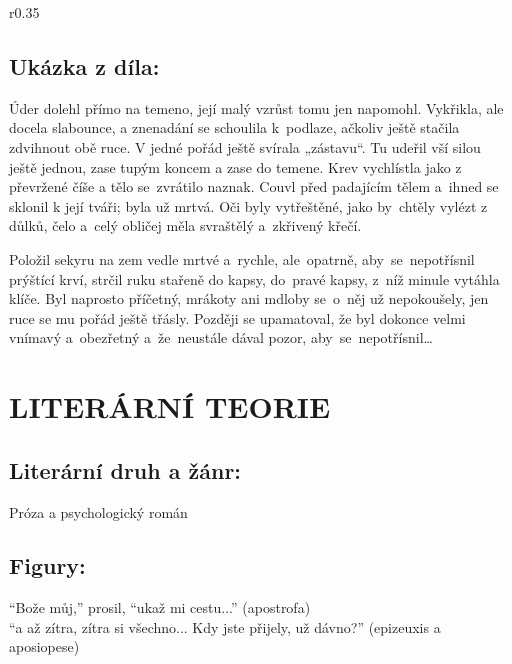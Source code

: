 \documentclass[A4paper]{extarticle} %
\begin{document}
\noindent\begin{wrapfigure}{r}{0.35\textwidth}
\tiny

\subsection*{Ukázka z díla:}
\setlength{\parindent}{3pt}
Úder dolehl přímo na temeno, její malý vzrůst tomu jen napomohl. Vykřikla,
ale docela slabounce, a znenadání se schoulila k~podlaze, ačkoliv ještě stačila zdvihnout obě ruce. V jedné
pořád ještě svírala „zástavu“. Tu udeřil vší silou ještě jednou, zase tupým koncem a zase do temene. Krev
vychlístla jako z převržené číše a tělo se~zvrátilo naznak. Couvl před padajícím tělem a~ihned se sklonil k její
tváři; byla už mrtvá. Oči byly vytřeštěné, jako by~chtěly vylézt z důlků, čelo a~celý obličej měla svraštělý a~zkřivený křečí.

Položil sekyru na zem vedle mrtvé a~rychle, ale~opatrně, aby~se~nepotřísnil prýštící krví, strčil ruku
stařeně do kapsy, do~pravé kapsy, z~níž minule vytáhla klíče. Byl naprosto příčetný, mrákoty ani mdloby se~o~něj už nepokoušely, jen ruce se mu pořád ještě třásly. Později se upamatoval, že byl dokonce velmi vnímavý
a~obezřetný a~že~neustále dával pozor, aby~se~nepotřísnil…
\end{wrapfigure}

\section*{LITERÁRNÍ TEORIE}

\subsection*{Literární druh a žánr:}
\noindent Próza a psychologický román



\subsection*{Figury:}
\noindent 
\enquote{Bože můj,} prosil, \enquote{ukaž mi cestu...} (apostrofa) \\
\enquote{a až zítra, zítra si všechno... Kdy jste přijely, už dávno?} (epizeuxis a aposiopese)
\end{document}
